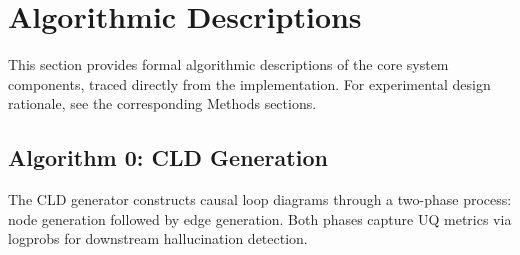 \chapter{Algorithmic Descriptions}
\label{sec:algorithms}

This section provides formal algorithmic descriptions of the core system components, traced directly from the implementation. For experimental design rationale, see the corresponding Methods sections.

\section{Algorithm 0: CLD Generation}
\label{alg:cld_generation}

The CLD generator constructs causal loop diagrams through a two-phase process: node generation followed by edge generation. Both phases capture UQ metrics via logprobs for downstream hallucination detection.

